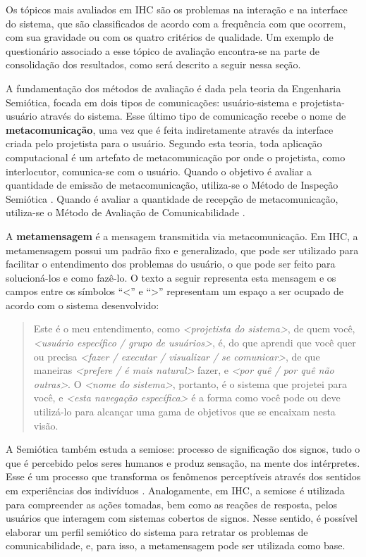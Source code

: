 \indent Os tópicos mais avaliados em IHC são os problemas na interação e na interface do sistema, que são classificados de acordo com a frequência com que ocorrem, com sua gravidade ou com os quatro critérios de qualidade. Um exemplo de questionário associado a esse tópico de avaliação encontra-se na parte de consolidação dos resultados, como será descrito a seguir nessa seção.

\indent A fundamentação dos métodos de avaliação é dada pela teoria da Engenharia Semiótica, focada em dois tipos de comunicações: usuário-sistema e projetista-usuário através do sistema. Esse último tipo de comunicação recebe o nome de \textbf{metacomunicação}, uma vez que é feita indiretamente através da interface criada pelo projetista para o usuário. Segundo esta teoria, toda aplicação computacional é um artefato de metacomunicação por onde o projetista, como interlocutor, comunica-se com o usuário. Quando o objetivo é avaliar a quantidade de emissão de metacomunicação, utiliza-se o Método de Inspeção Semiótica \cite{IHCbook}. Quando é avaliar a quantidade de recepção de metacomunicação, utiliza-se o Método de Avaliação de Comunicabilidade \cite{IHCbook}. 

\indent A \textbf{metamensagem} é a mensagem transmitida via metacomunicação. Em IHC, a metamensagem possui um padrão fixo e generalizado, que pode ser utilizado para facilitar o entendimento dos problemas do usuário, o que pode ser feito para solucioná-los e como fazê-lo. O texto a seguir representa esta mensagem e os campos entre os símbolos ``<'' e ``>'' representam um espaço a ser ocupado de acordo com o sistema desenvolvido:

\begin{quote}
Este é o meu entendimento, como \textit{<projetista do sistema>}, de quem você, \textit{<usuário específico / grupo de usuários>}, é, do que aprendi que você quer ou precisa \textit{<fazer / executar / visualizar / se comunicar>}, de que maneiras \textit{<prefere / é mais natural>} fazer, e \textit{<por quê / por quê não outras>}. O \textit{<nome do sistema>}, portanto, é o sistema que projetei para você, e \textit{<esta navegação específica>} é a forma como você pode ou deve utilizá-lo para alcançar uma gama de objetivos que se encaixam nesta visão.
\end{quote}

\indent A Semiótica também estuda a semiose: processo de significação dos signos, tudo o que é percebido pelos seres humanos e produz sensação, na mente dos intérpretes. Esse é um processo que transforma os fenômenos perceptíveis através dos sentidos em experiências dos indivíduos \cite{semiose01}. Analogamente, em IHC, a semiose é utilizada para compreender as ações tomadas, bem como as reações de resposta, pelos usuários que interagem com sistemas cobertos de signos. Nesse sentido, é possível elaborar um perfil semiótico do sistema para retratar os problemas de comunicabilidade, e, para isso, a metamensagem pode ser utilizada como base.


